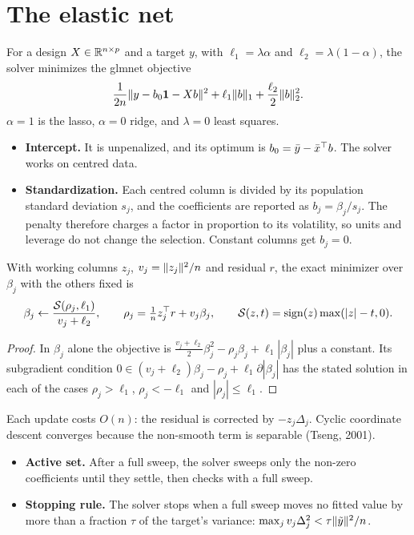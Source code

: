 \section{The elastic net}
For a design $X\in\mathbb{R}^{n\times p}$ and a target $y$, with $\ell_1=\lambda\alpha$ and
$\ell_2=\lambda(1-\alpha)$, the solver minimizes the glmnet objective
\[
  \frac1{2n}\lVert y-b_0\mathbf 1-Xb\rVert^2+\ell_1\lVert b\rVert_1+\frac{\ell_2}2\lVert b\rVert_2^2 .
\]
$\alpha=1$ is the lasso, $\alpha=0$ ridge, and $\lambda=0$ least squares.
\begin{itemize}
  \item \textbf{Intercept.} It is unpenalized, and its optimum is $b_0=\bar y-\bar x^\top b$.
        The solver works on centred data.
  \item \textbf{Standardization.} Each centred column is divided by its population
        standard deviation $s_j$, and the coefficients are reported as $b_j=\beta_j/s_j$.
        The penalty therefore charges a factor in proportion to its volatility, so units and
        leverage do not change the selection. Constant columns get $b_j=0$.
\end{itemize}

\begin{proposition}
With working columns $z_j$, $v_j=\lVert z_j\rVert^2/n$ and residual $r$, the exact minimizer over
$\beta_j$ with the others fixed is
\[
  \beta_j\leftarrow\frac{\mathcal{S}(\rho_j,\ell_1)}{v_j+\ell_2},\qquad
  \rho_j=\tfrac1nz_j^\top r+v_j\beta_j,\qquad
  \mathcal{S}(z,t)=\operatorname{sign}(z)\max(|z|-t,0).
\]
\end{proposition}
\begin{proof}
In $\beta_j$ alone the objective is $\frac{v_j+\ell_2}2\beta_j^2-\rho_j\beta_j+\ell_1|\beta_j|$
plus a constant. Its subgradient condition $0\in(v_j+\ell_2)\beta_j-\rho_j+\ell_1\partial|\beta_j|$
has the stated solution in each of the cases $\rho_j>\ell_1$, $\rho_j<-\ell_1$ and
$|\rho_j|\le\ell_1$.
\end{proof}
Each update costs $O(n)$: the residual is corrected by $-z_j\Delta_j$. Cyclic coordinate
descent converges because the non-smooth term is separable (Tseng, 2001).
\begin{itemize}
  \item \textbf{Active set.} After a full sweep, the solver sweeps only the non-zero
        coefficients until they settle, then checks with a full sweep.
  \item \textbf{Stopping rule.} The solver stops when a full sweep moves no fitted value by
        more than a fraction $\tau$ of the target's variance:
        $\max_jv_j\Delta_j^2<\tau\lVert \tilde y\rVert^2/n$.
\end{itemize}

